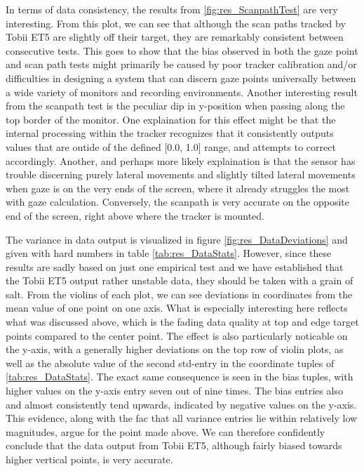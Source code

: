 In terms of data consistency, the results from \ref{fig:res_ScanpathTest} are very interesting. From this plot, we can see that although the scan paths tracked by Tobii ET5 are slightly off their target, they are remarkably consistent between consecutive tests. This goes to show that the bias observed in both the gaze point and scan path tests might primarily be caused by poor tracker calibration and/or difficulties in designing a system that can discern gaze points universally between a wide variety of monitors and recording environments. Another interesting result from the scanpath test is the peculiar dip in y-position when passing along the top border of the monitor. One explaination for this effect might be that the internal processing within the tracker recognizes that it consistently outputs values that are outide of the defined [0.0, 1.0] range, and attempts to correct accordingly. Another, and perhaps more likely explaination is that the sensor has trouble discerning purely lateral movements and slightly tilted lateral movements when gaze is on the very ends of the screen, where it already struggles the most with gaze calculation. Conversely, the scanpath is very accurate on the opposite end of the screen, right above where the tracker is mounted.

The variance in data output is visualized in figure \ref{fig:res_DataDeviations} and given with hard numbers in table \ref{tab:res_DataStats}. However, since these results are sadly based on just one empirical test and we have established that the Tobii ET5 output rather unstable data, they should be taken with a grain of salt. From the violins of each plot, we can see deviations in coordinates from the mean value of one point on one axis. What is especially interesting here reflects what was discussed above, which is the fading data quality at top and edge target points compared to the center point. The effect is also particularly noticable on the y-axis, with a generally higher deviations on the top row of violin plots, as well as the absolute value of the second std-entry in the coordinate tuples of \ref{tab:res_DataStats}. The exact same consequence is seen in the bias tuples, with higher values on the y-axis entry seven out of nine times. The bias entries also and almost consistently tend upwards, indicated by negative values on the y-axis. This evidence, along with the fac that all variance entries lie within relatively low magnitudes, argue for the point made above. We can therefore confidently conclude that the data output from Tobii ET5, although fairly biased towards higher vertical points, is very accurate.

